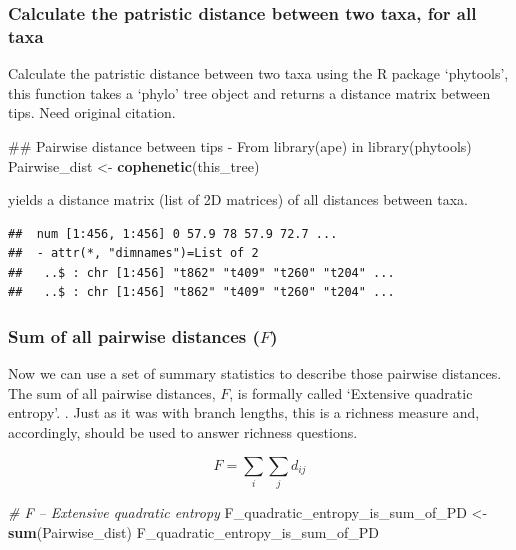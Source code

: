 \documentclass[]{book}
\newenvironment{Shaded}{\begin{snugshade}}{\end{snugshade}}
\newcommand{\KeywordTok}[1]{\textcolor[rgb]{0.13,0.29,0.53}{\textbf{{#1}}}}
\newcommand{\StringTok}[1]{\textcolor[rgb]{0.31,0.60,0.02}{{#1}}}
\newcommand{\CommentTok}[1]{\textcolor[rgb]{0.56,0.35,0.01}{\textit{{#1}}}}
\newcommand{\NormalTok}[1]{{#1}}
\theoremstyle{definition}
\theoremstyle{definition}
\theoremstyle{definition}
\theoremstyle{remark}
\begin{document}
\subsubsection{Calculate the patristic distance between two taxa, for
all
taxa}\label{calculate-the-patristic-distance-between-two-taxa-for-all-taxa}

Calculate the patristic distance between two taxa using the R package
`phytools', this function takes a `phylo' tree object and returns a
distance matrix between tips. Need original citation.

\begin{Shaded}
\begin{Highlighting}[]
\NormalTok{## Pairwise distance between tips - From library(ape) in library(phytools)}
\NormalTok{Pairwise_dist <-}\StringTok{ }\KeywordTok{cophenetic}\NormalTok{(this_tree)}
\end{Highlighting}
\end{Shaded}

yields a distance matrix (list of 2D matrices) of all distances between
taxa.

\begin{verbatim}
##  num [1:456, 1:456] 0 57.9 78 57.9 72.7 ...
##  - attr(*, "dimnames")=List of 2
##   ..$ : chr [1:456] "t862" "t409" "t260" "t204" ...
##   ..$ : chr [1:456] "t862" "t409" "t260" "t204" ...
\end{verbatim}

\subsubsection{\texorpdfstring{Sum of all pairwise distances
(\(F\))}{Sum of all pairwise distances (F)}}\label{sum-of-all-pairwise-distances-f}

Now we can use a set of summary statistics to describe those pairwise
distances. The sum of all pairwise distances, \(F\), is formally called
`Extensive quadratic entropy'. \citep{Izsak2000}. Just as it was with
branch lengths, this is a richness measure and, accordingly, should be
used to answer richness questions.

\[F = \sum_{i} \sum_{j} d_{ij}\]

\begin{Shaded}
\begin{Highlighting}[]
\CommentTok{# F -- Extensive quadratic entropy}
\NormalTok{F_quadratic_entropy_is_sum_of_PD <-}\StringTok{ }\KeywordTok{sum}\NormalTok{(Pairwise_dist)}
\NormalTok{F_quadratic_entropy_is_sum_of_PD}
\end{Highlighting}
\end{Shaded}
\end{document}
